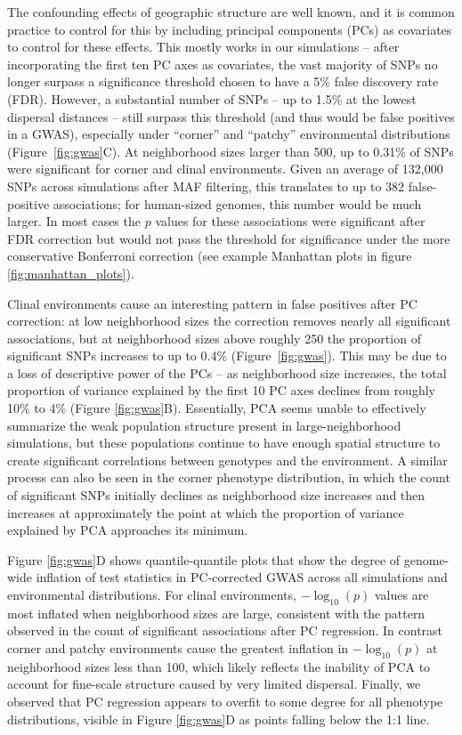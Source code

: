 \documentclass[10pt,twoside,lineno,hidelinks]{preprint}
\begin{document}
The confounding effects of geographic structure are well known, 
and it is common practice to control for this by including principal components (PCs) as covariates to control for these effects.
This mostly works in our simulations -- after incorporating the first ten PC axes as covariates, the vast majority of SNPs no longer surpass a significance threshold chosen to have a 5\% false discovery rate (FDR).
However, a substantial number of SNPs -- up to 1.5\% at the lowest dispersal distances -- still surpass this threshold (and thus would be false positives in a GWAS),
especially under ``corner'' and ``patchy'' environmental distributions (Figure~\ref{fig:gwas}C). 
At neighborhood sizes larger than 500, up to 0.31\% of SNPs were significant for corner and clinal environments. 
Given an average of 132,000 SNPs across simulations after MAF filtering, this translates to up to 382 false-positive associations; for human-sized genomes, this number would be much larger.
In most cases the $p$ values for these associations were significant after FDR correction but would not pass the threshold for significance under the more conservative Bonferroni correction (see example Manhattan plots in figure \ref{fig:manhattan_plots}).

Clinal environments cause an interesting pattern in false positives after PC correction: at low neighborhood sizes the correction removes nearly all significant associations, 
but at neighborhood sizes above roughly 250 the proportion of significant SNPs increases to up to 0.4\% (Figure~\ref{fig:gwas}). 
This may be due to a loss of descriptive power of the PCs
-- as neighborhood size increases, the total proportion of variance explained by the first 10 PC axes declines from roughly 10\% to 4\% (Figure \ref{fig:gwas}B). 
Essentially, PCA seems unable to effectively summarize the weak population structure present in large-neighborhood simulations, but these populations continue to have enough spatial structure to create significant correlations between genotypes and the environment. A similar process can also be seen in the corner phenotype distribution, in which the count of significant SNPs initially declines as neighborhood size increases and then increases at approximately the point at which the proportion of variance explained by PCA approaches its minimum. 

Figure \ref{fig:gwas}D shows quantile-quantile plots that show the degree of genome-wide inflation of test statistics in PC-corrected GWAS across all simulations and environmental distributions. 
For clinal environments, $-\log_{10}(p)$ values are most inflated when neighborhood sizes are large, consistent with the pattern observed in the count of significant associations after PC regression. In contrast corner and patchy environments cause the greatest inflation in $-\log_{10}(p)$ at neighborhood sizes less than 100, which likely reflects the inability of PCA to account for fine-scale structure caused by very limited dispersal. Finally, we observed that PC regression appears to overfit to some degree for all phenotype distributions, visible in Figure \ref{fig:gwas}D as points falling below the 1:1 line.
\end{document}
